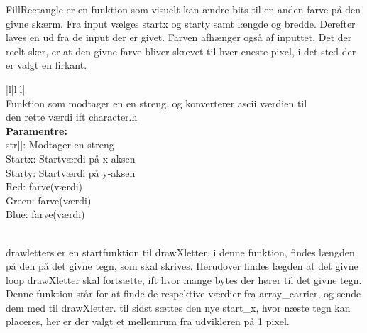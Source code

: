 FillRectangle er en funktion som visuelt kan ændre bits til en anden farve på den givne skærm. Fra input vælges startx og starty samt længde og bredde. Derefter laves en ud fra de input der er givet. Farven afhænger også af inputtet. Det der reelt sker, er at den givne farve bliver skrevet til hver eneste pixel, i det sted der er valgt en firkant. 

\begin{center}
\begin{tabular}{ |l|l|l| }
\hline
{} \\
\hline
Funktion som modtager en en streng, og konverterer ascii værdien til \\den rette værdi ift character.h \\
\hline
\textbf{Paramentre:}  \\str[]: Modtager en streng\\  Startx: Startværdi på x-aksen \\Starty: Startværdi på y-aksen\\ Red: farve(værdi)\\ Green: farve(værdi) \\ Blue: farve(værdi)\\
\\

\hline
\end{tabular}
\end{center}  

drawletters er en startfunktion til drawXletter, i denne funktion, findes længden på den på det givne tegn, som skal skrives. Herudover findes lægden at det givne loop drawXletter skal fortsætte, ift hvor mange bytes der hører til det givne tegn. Denne funktion står for at finde de respektive værdier fra array\_carrier, og sende dem med til drawXletter.  til sidst sættes den nye start\_x, hvor næste tegn kan placeres, her er der valgt et mellemrum fra udvikleren på 1 pixel.

